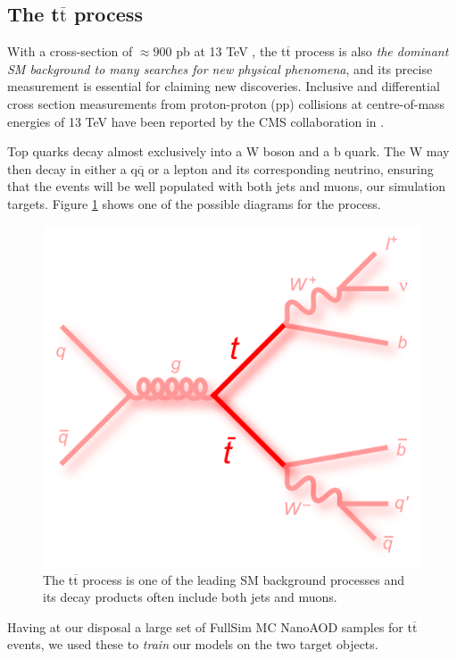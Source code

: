 \subsection{The t$\overline{\text{t}}$ process}
With a cross-section of $\approx 900$ pb at 13 TeV , the t$\overline{\text{t}}$ process is also \emph{the dominant SM background to many searches for new
physical phenomena}, and its precise measurement is essential for claiming new discoveries.
Inclusive and differential cross section measurements from
proton-proton (pp) collisions at centre-of-mass energies of 13 TeV have been reported by
the CMS collaboration in \cite{Sirunyan_2017}.


Top quarks decay almost exclusively into a W boson and a b quark. The W may then decay in either a q$\overline{\text{q}}$ or a lepton and its corresponding neutrino, ensuring that the events will be well populated with both jets and muons, our simulation targets. Figure \ref{fig:ttfig} shows one of the possible diagrams for the process.

\begin{figure}
    \centering
    \includegraphics[width=0.75\linewidth]{gfx/ch5/feynman_ttbar_ljets_longt.png}
    \caption[t$\overline{\text{t}}$ diagram]{ The t$\overline{\text{t}}$ process is one of the leading SM background processes and its decay products often include both jets and muons.}
    \label{fig:ttfig}
\end{figure}

Having at our disposal a large set of FullSim MC NanoAOD samples for t$\overline{\text{t}}$ events, we used these to \emph{train} our models on the two target objects.

